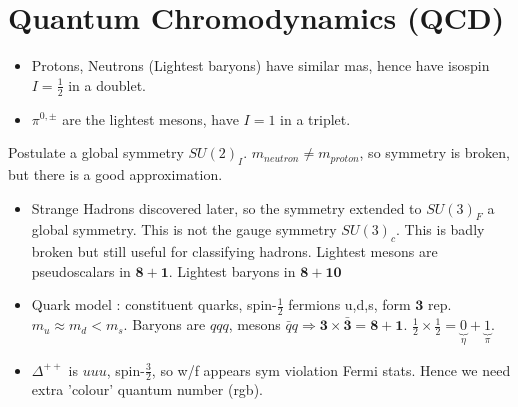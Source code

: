 \documentclass{article}
\begin{document}
\section{Quantum Chromodynamics (QCD)}

\begin{itemize}
    \item Protons, Neutrons (Lightest baryons) have similar mas, hence have isospin $I= \frac{1}{2}$ in a doublet. 
    \item $\pi^{0,\pm}$ are the lightest mesons, have $I=1$ in a triplet. 
\end{itemize}
Postulate a global symmetry $SU(2)_I$. $m_{neutron} \neq m_{proton}$, so symmetry is broken, but there is a good approximation. 
\begin{itemize}
    \item Strange Hadrons discovered later, so the symmetry extended to $SU(3)_F$ a global symmetry. This is not the gauge symmetry $SU(3)_c$. This is badly broken but still useful for classifying hadrons. Lightest mesons are pseudoscalars in $\bm{8} + \bm{1}$. Lightest baryons in $\bm{8} + \bm{10}$
    \item Quark model : constituent quarks, spin-$\frac{1}{2}$ fermions u,d,s, form $\bm{3}$ rep. $m_u \approx m_d < m_s$. Baryons are $qqq$, mesons $\bar{q}q \Rightarrow \bm{3} \times \bar{\bm{3}} = \bm{8} + \bm{1}$. $\frac{1}{2} \times \frac{1}{2} = \underbrace{0}_{\eta} + \underbrace{1}_{\pi}$.
    \item $\Delta^{++}$ is $uuu$, spin-$\frac{3}{2}$, so w/f appears sym violation Fermi stats. Hence we need extra 'colour' quantum number (rgb). 
\end{itemize}
\end{document}
